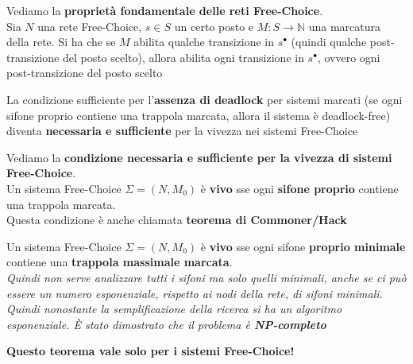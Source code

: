 \documentclass[a4paper,12pt, oneside]{book}
\begin{document}
\newpage
\begin{teorema}
  Vediamo la \textbf{proprietà fondamentale delle reti Free-Choice}.\\
  Sia $N$ una rete Free-Choice, $s \in S $ un certo posto e $M : S\to
  \mathbb{N}$ una marcatura della rete. Si ha che se $M$ abilita qualche
  transizione in $s^\bullet$ (quindi qualche post-transizione del posto scelto),
  allora abilita ogni transizione in $s^\bullet$, ovvero ogni post-transizione
  del posto scelto 
\end{teorema}
La condizione sufficiente per l’\textbf{assenza di deadlock} per sistemi marcati
(se ogni sifone proprio contiene una trappola marcata, allora il sistema è
deadlock-free) diventa\textbf{ necessaria e sufficiente} per la vivezza nei
sistemi Free-Choice 
\begin{teorema}
  Vediamo la \textbf{condizione necessaria e sufficiente per la vivezza di
    sistemi Free-Choice}.\\
  Un sistema Free-Choice $\Sigma=(N,M_0)$ è \textbf{vivo} sse ogni
  \textbf{sifone proprio} contiene una \textnormal{trappola marcata}.\\
  Questa condizione è anche chiamata \textbf{teorema di Commoner/Hack} 
\end{teorema}
\begin{corollario}
  Un sistema Free-Choice $\Sigma=(N,M_0)$ è \textbf{vivo} sse ogni sifone
  \textbf{proprio minimale} contiene una \textbf{trappola massimale marcata}.\\
  \textit{Quindi non serve analizzare tutti i sifoni ma solo quelli minimali,
    anche se ci può essere un numero esponenziale, rispetto ai nodi della rete,
    di sifoni minimali. Quindi nonostante la semplificazione della ricerca si ha
    un algoritmo esponenziale. È stato dimostrato che il problema è
    \textbf{NP-completo}} 
\end{corollario}
\textbf{Questo teorema vale solo per i sistemi Free-Choice!}
\end{document}
